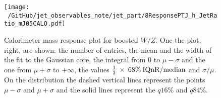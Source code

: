 \begin{figure}[!ht]
  \centering
      \texttt{[image: ~/GitHub/jet\_observables\_note/jet\_part/8ResponsePTJ\_h\_JetRatio\_mJ05CALO.pdf]}
  \caption[$\mcal$ response single $\pt$ bin]{Calorimeter mass response plot for boosted $W/Z$. One the plot, right, are shown: the number of entries, the mean and the width of the fit to the Gaussian core, the integral from 0 to $\mu-\sigma$ and the one from $\mu+\sigma$ to $+\infty$, the values $\frac{1}{2}\: \times\: 68\% \:\textrm{IQnR/median}$ and $\sigma/\mu$. On the distribution the dashed vertical lines represent the points $\mu-\sigma$ and $\mu+\sigma$ and the solid lines represent the $q16\%$ and $q84\%$.}
  \label{fig:iqrbin}
\end{figure}